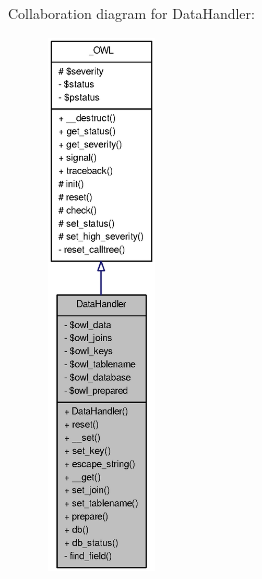 Collaboration diagram for DataHandler:\nopagebreak
\begin{figure}[H]
\begin{center}
\leavevmode
\includegraphics[height=400pt]{classDataHandler__coll__graph}
\end{center}
\end{figure}
